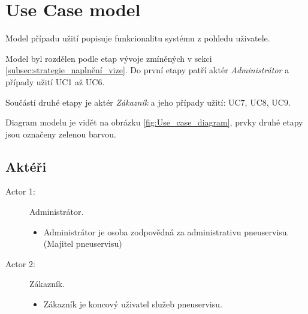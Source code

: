 \section{Use Case model} \label{sec:UseCaseModel}
Model případu užití popisuje funkcionalitu systému z pohledu uživatele. 

Model byl rozdělen podle etap vývoje zmíněných v sekci \ref{subsec:strategie_naplnění_vize}.
Do první etapy patří aktér \emph{Administrátor} a případy užití UC1 až UC6.

Součástí druhé etapy je aktér \emph{Zákazník} a jeho případy užití: UC7, UC8, UC9. 

Diagram modelu je vidět na obrázku \ref{fig:Use_case_diagram}, prvky druhé etapy jsou označeny zelenou barvou.
\subsection{Aktéři}
\begin{description}
    \item [Actor 1:] Administrátor.
    \begin{itemize}
        \item Administrátor je osoba zodpovědná za administrativu pneuservisu. (Majitel pneuservisu)
    \end{itemize}
    \item [Actor 2:] Zákazník.
    \begin{itemize}
        \item Zákazník je koncový uživatel služeb pneuservisu. 
    \end{itemize}
\end{description}
